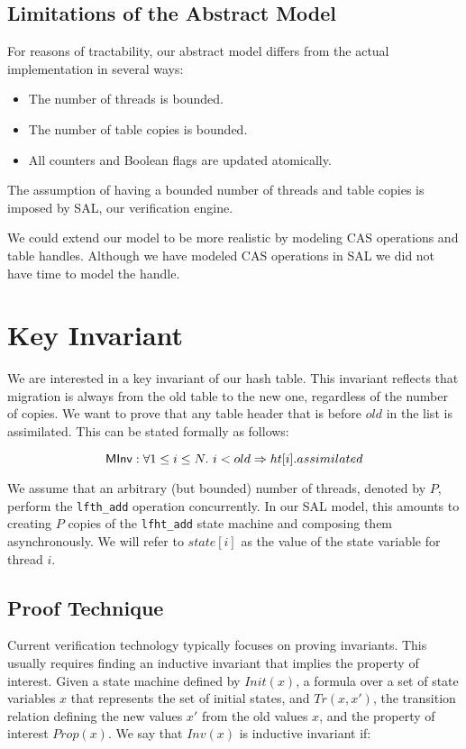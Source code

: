 \subsection{Limitations of the Abstract Model}

For reasons of tractability, our abstract model differs from the actual
implementation in several ways:
\begin{itemize}
\item The number of threads is bounded.
\item The number of table copies is bounded.
\item All counters and Boolean flags are updated atomically.  
\end{itemize}
The assumption of having a bounded number of threads and table copies
is imposed by SAL, our verification engine.

We could extend our model to be more realistic by modeling CAS
operations and table handles. Although we have modeled CAS operations in
SAL we did not have time to model the handle.


\section{Key Invariant}

We are interested in a key invariant of our hash table. This invariant
reflects that migration is always from the old table to the new one,
regardless of the number of copies. We want to prove that any table header
that is before $old$ in the list is assimilated. This can be stated formally as
follows:

  \[ \mathsf{MInv}: \forall 1 \leq i \leq N.~ i < old \Rightarrow \mbox{$ht[i]$}.assimilated \]

We assume that an arbitrary (but bounded) number of threads, denoted
by $P$, perform the \texttt{lfth\_add} operation concurrently. In our
SAL model, this amounts to creating $P$ copies of the \texttt{lfht\_add}
state machine and composing them asynchronously. We will refer to
$state[i]$ as the value of the state variable for thread $i$.

\subsection{Proof Technique}

Current verification technology typically focuses on proving
invariants. This usually requires finding an inductive invariant that
implies the property of interest. Given a state machine defined by
$Init(x)$, a formula over a set of state variables $x$ that represents
the set of initial states, and $Tr(x,x')$, the transition relation
defining the new values $x'$ from the old values $x$, and the property
of interest $Prop(x)$. We say that $Inv(x)$ is inductive invariant if:

